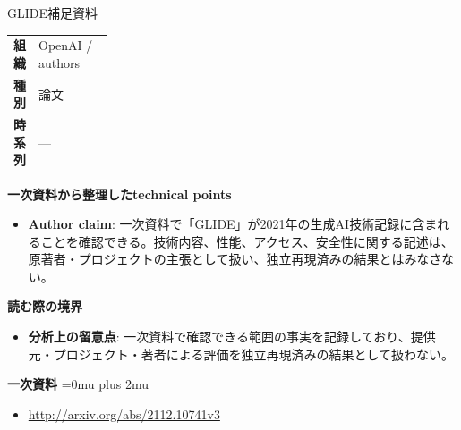 \begin{technicalnote}{GLIDE}{補足資料}
\begingroup
\begin{tabularx}{\linewidth}{@{}>{\bfseries}p{0.22\linewidth}X@{}}
組織 & OpenAI / authors \\
種別 & 論文 \\
時系列 & — \\
\end{tabularx}
\smallskip
{\bfseries 一次資料から整理したtechnical points}
\begin{itemize}[leftmargin=1.5em,itemsep=0.35em]
\item \textbf{Author claim}: 一次資料で「GLIDE」が2021年の生成AI技術記録に含まれることを確認できる。技術内容、性能、アクセス、安全性に関する記述は、原著者・プロジェクトの主張として扱い、独立再現済みの結果とはみなさない。
\end{itemize}
\begin{minipage}{\linewidth}
{\bfseries 読む際の境界}
\begin{itemize}[leftmargin=1.5em,itemsep=0.35em]
\item \textbf{分析上の留意点}: 一次資料で確認できる範囲の事実を記録しており、提供元・プロジェクト・著者による評価を独立再現済みの結果として扱わない。
\end{itemize}
\begin{samepage}
{\bfseries 一次資料}
\begingroup\sloppy
\Urlmuskip=0mu plus 2mu\relax
\begin{itemize}[leftmargin=1.5em,itemsep=0.25em]
\item {\scriptsize\url{http://arxiv.org/abs/2112.10741v3}}
\end{itemize}
\endgroup
\end{samepage}
\end{minipage}
\endgroup
\end{technicalnote}
\medskip

